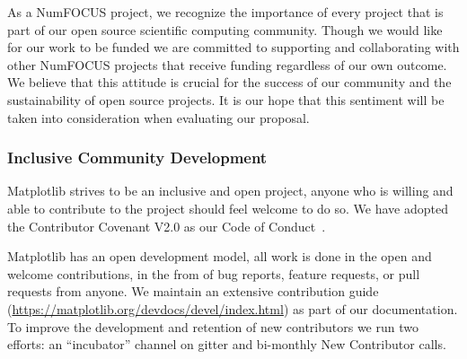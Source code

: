 \documentclass[12pt]{article}
\numberwithin{page}{section}
\begin{document}
As a NumFOCUS project, we recognize the importance of every project
that is part of our open source scientific computing community. Though
we would like for our work to be funded we are committed to supporting
and collaborating with other NumFOCUS projects that receive funding
regardless of our own outcome. We believe that this attitude is
crucial for the success of our community and the sustainability of
open source projects. It is our hope that this sentiment will be taken
into consideration when evaluating our proposal.


\subsubsection{Inclusive Community Development}


Matplotlib strives to be an inclusive and open project, anyone who is
willing and able to contribute to the project should feel welcome to
do so.  We have adopted the Contributor Covenant V2.0 as
our Code of Conduct~\cite{CoC}.

Matplotlib has an open development model, all work is done in the open and
welcome contributions, in the from of bug reports, feature requests, or pull
requests from anyone.  We maintain an extensive contribution guide
(\url{https://matplotlib.org/devdocs/devel/index.html}) as part of our
documentation.  To improve the development and retention of new contributors we
run two efforts: an ``incubator'' channel on gitter and bi-monthly New
Contributor calls.

\end{document}
